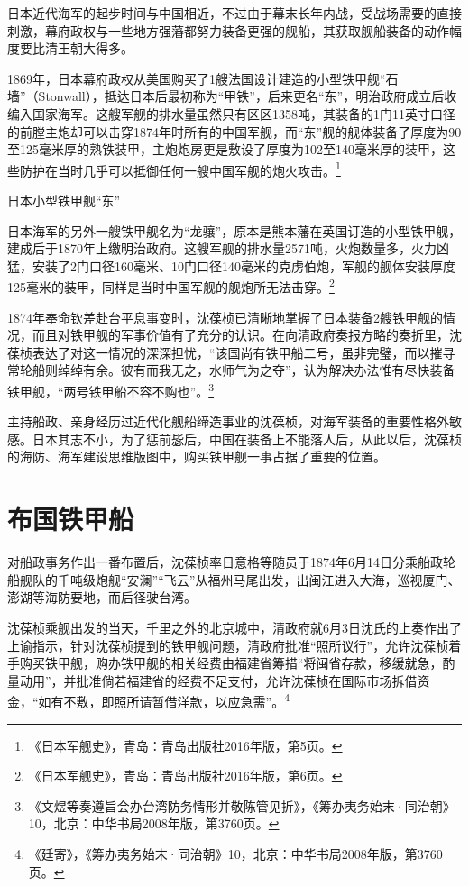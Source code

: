 \documentclass[12pt,UTF8]{ctexbook}
\begin{document}
日本近代海军的起步时间与中国相近，不过由于幕末长年内战，受战场需要的直接刺激，幕府政权与一些地方强藩都努力装备更强的舰船，其获取舰船装备的动作幅度要比清王朝大得多。

1869年，日本幕府政权从美国购买了1艘法国设计建造的小型铁甲舰“石墙”（Stonwall），抵达日本后最初称为“甲铁”，后来更名“东”，明治政府成立后收编入国家海军。这艘军舰的排水量虽然只有区区1358吨，其装备的1门11英寸口径的前膛主炮却可以击穿1874年时所有的中国军舰，而“东”舰的舰体装备了厚度为90至125毫米厚的熟铁装甲，主炮炮房更是敷设了厚度为102至140毫米厚的装甲，这些防护在当时几乎可以抵御任何一艘中国军舰的炮火攻击。\footnote{《日本军舰史》，青岛：青岛出版社2016年版，第5页。}

日本小型铁甲舰“东”

日本海军的另外一艘铁甲舰名为“龙骧”，原本是熊本藩在英国订造的小型铁甲舰，建成后于1870年上缴明治政府。这艘军舰的排水量2571吨，火炮数量多，火力凶猛，安装了2门口径160毫米、10门口径140毫米的克虏伯炮，军舰的舰体安装厚度125毫米的装甲，同样是当时中国军舰的舰炮所无法击穿。\footnote{《日本军舰史》，青岛：青岛出版社2016年版，第6页。}

1874年奉命钦差赴台平息事变时，沈葆桢已清晰地掌握了日本装备2艘铁甲舰的情况，而且对铁甲舰的军事价值有了充分的认识。在向清政府奏报方略的奏折里，沈葆桢表达了对这一情况的深深担忧，“该国尚有铁甲船二号，虽非完璧，而以摧寻常轮船则绰绰有余。彼有而我无之，水师气为之夺”，认为解决办法惟有尽快装备铁甲舰，“两号铁甲船不容不购也”。\footnote{《文煜等奏遵旨会办台湾防务情形并敬陈管见折》，《筹办夷务始末·同治朝》10，北京：中华书局2008年版，第3760页。}

主持船政、亲身经历过近代化舰船缔造事业的沈葆桢，对海军装备的重要性格外敏感。日本其志不小，为了惩前毖后，中国在装备上不能落人后，从此以后，沈葆桢的海防、海军建设思维版图中，购买铁甲舰一事占据了重要的位置。

\section{布国铁甲船}

对船政事务作出一番布置后，沈葆桢率日意格等随员于1874年6月14日分乘船政轮船舰队的千吨级炮舰“安澜”“飞云”从福州马尾出发，出闽江进入大海，巡视厦门、澎湖等海防要地，而后径驶台湾。

沈葆桢乘舰出发的当天，千里之外的北京城中，清政府就6月3日沈氏的上奏作出了上谕指示，针对沈葆桢提到的铁甲舰问题，清政府批准“照所议行”，允许沈葆桢着手购买铁甲舰，购办铁甲舰的相关经费由福建省筹措“将闽省存款，移缓就急，酌量动用”，并批准倘若福建省的经费不足支付，允许沈葆桢在国际市场拆借资金，“如有不敷，即照所请暂借洋款，以应急需”。\footnote{《廷寄》，《筹办夷务始末·同治朝》10，北京：中华书局2008年版，第3760页。}
\end{document}
